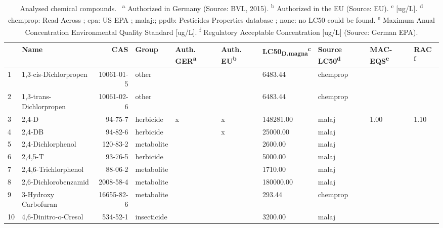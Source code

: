 \begingroup\fontsize{8pt}{10pt}\selectfont
\begin{longtable}{lp{3cm}rlp{0.5cm}p{0.5cm}p{1.5cm}p{1cm}p{1cm}p{1cm}}
\caption{Analysed chemical compounds. \
                    \textsuperscript{a} Authorized in Germany (Source: BVL, 2015). 
                    \textsuperscript{b} Authorized in the EU (Source: EU).
                    \textsuperscript{c} [ug/L].
                    \textsuperscript{d} chemprop: Read-Across \citep{schuurmann_quantitative_2011};
                                         epa: US EPA \citep{u.s._epa_ecotoxicology_2015};
                                         malaj:\citep{malaj_organic_2014};
                                         ppdb: Pesticides Properties database \citep{lewis_international_2016};
                                         none: no LC50 could be found.
                    \textsuperscript{e} Maximum Anual Concentration Environmental Quality Standard [ug/L].
                    \textsuperscript{f} Regulatory Acceptable Concentration [ug/L] (Source: German EPA).} \\ 
  \toprule
 & Name & CAS & Group & Auth. GER\textsuperscript{a} & Auth. EU\textsuperscript{b} & LC50\textsubscript{D.magna}\textsuperscript{c} & Source LC50\textsuperscript{d} & MAC-EQS\textsuperscript{e} & RAC \textsuperscript{f} \\ 
  \midrule
1 & 1,3-cis-Dichlorpropen & 10061-01-5 & other &  &  & 6483.44 & chemprop &  &  \\ 
  2 & 1,3-trans-Dichlorpropen & 10061-02-6 & other &  &  & 6483.44 & chemprop &  &  \\ 
  3 & 2,4-D & 94-75-7 & herbicide & x & x & 148281.00 & malaj & 1.00 & 1.10 \\ 
  4 & 2,4-DB & 94-82-6 & herbicide &  & x & 25000.00 & malaj &  &  \\ 
  5 & 2,4-Dichlorphenol & 120-83-2 & metabolite &  &  & 2600.00 & malaj &  &  \\ 
  6 & 2,4,5-T & 93-76-5 & herbicide &  &  & 5000.00 & malaj &  &  \\ 
  7 & 2,4,6-Trichlorphenol & 88-06-2 & metabolite &  &  & 1710.00 & malaj &  &  \\ 
  8 & 2,6-Dichlorobenzamid & 2008-58-4 & metabolite &  &  & 180000.00 & malaj &  &  \\ 
  9 & 3-Hydroxy Carbofuran & 16655-82-6 & metabolite &  &  & 293.44 & chemprop &  &  \\ 
  10 & 4,6-Dinitro-o-Cresol & 534-52-1 & insecticide &  &  & 3200.00 & malaj &  &  \\ 

\end{longtable}
